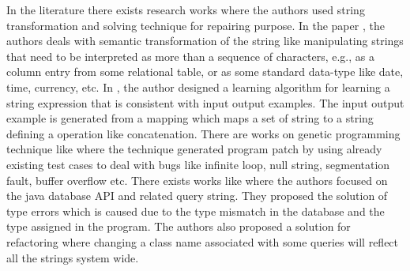 In the literature there exists research works where the authors used string
transformation and solving technique for repairing purpose. In the paper
\cite{Singh:2012}, the authors deals with semantic transformation of the string
like manipulating strings that need to be interpreted as more than a sequence of
characters, e.g., as a column entry from some relational table, or as some
standard data-type like date, time, currency, etc. In \cite{Gulwani:2011}, the
author designed a learning algorithm for learning a string expression that is
consistent with input output examples. The input output example is generated
from a mapping which maps a set of string to a string defining a operation like
concatenation. There are works on genetic programming technique like
\cite{LeGoues:2012Ex, LeGoues:2012, DBLP:journals/cacm/WeimerFGN10} where the
 technique generated program patch by using already existing test cases to deal
with bugs like infinite loop, null string, segmentation fault, buffer overflow
etc. There exists works like \cite{Tatlock:2008} where the authors focused on
the java database API and related query string. They proposed the solution of
type errors which is caused due to the type mismatch in the database and the
type assigned in the program. The authors also proposed a solution for
refactoring where changing a class name associated with some queries will
reflect all the strings system wide.


